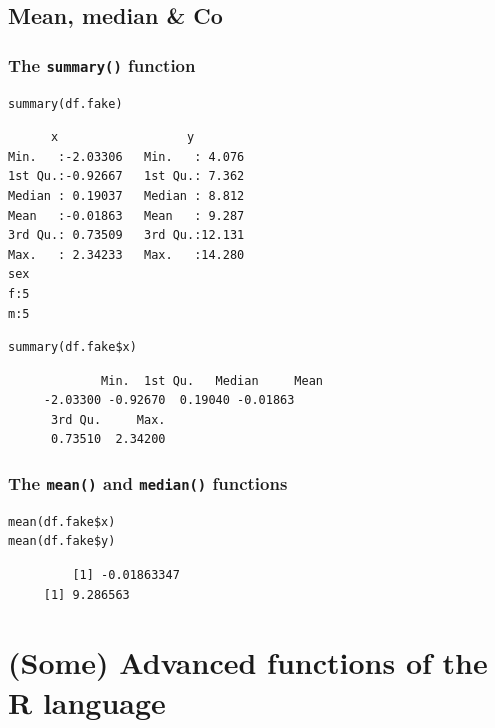 \documentclass[bigger]{beamer}
\begin{document}
\subsection{Mean, median \& Co}
\label{sec-5-2}
\begin{frame}[fragile,shrink=5]
\frametitle{The \texttt{summary()} function}
\label{sec-5-2-1}


\lstset{language=R}
\begin{lstlisting}
summary(df.fake)
\end{lstlisting}

    
\begin{verbatim}
      x                  y         
Min.   :-2.03306   Min.   : 4.076  
1st Qu.:-0.92667   1st Qu.: 7.362  
Median : 0.19037   Median : 8.812  
Mean   :-0.01863   Mean   : 9.287  
3rd Qu.: 0.73509   3rd Qu.:12.131  
Max.   : 2.34233   Max.   :14.280  
sex  
f:5  
m:5
\end{verbatim}


\lstset{language=R}
\begin{lstlisting}
summary(df.fake$x)
\end{lstlisting}

\begin{verbatim}
             Min.  1st Qu.   Median     Mean 
     -2.03300 -0.92670  0.19040 -0.01863 
      3rd Qu.     Max. 
      0.73510  2.34200
\end{verbatim}
\end{frame}
\begin{frame}[fragile]
\frametitle{The \texttt{mean()} and \texttt{median()} functions}
\label{sec-5-2-2}


\lstset{language=R}
\begin{lstlisting}
mean(df.fake$x)
mean(df.fake$y)
\end{lstlisting}

\begin{verbatim}
         [1] -0.01863347
     [1] 9.286563
\end{verbatim}
\end{frame}
\section{(Some) Advanced functions of the R language}
\label{sec-6}
\end{document}
